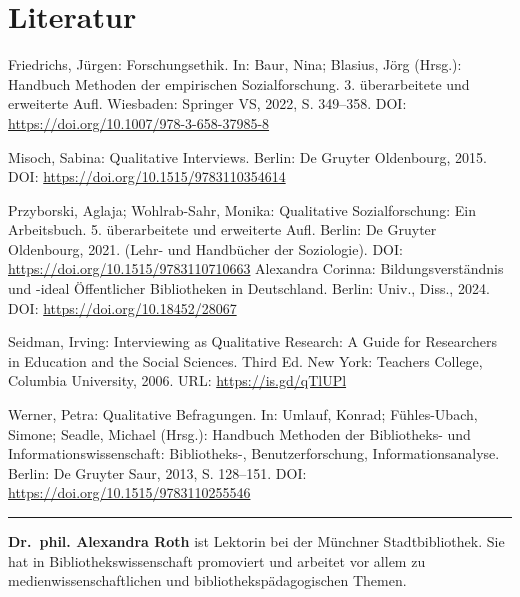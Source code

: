 \documentclass[a4paper,
fontsize=11pt,
oneside,
numbers=noperiodatend,
parskip=half-,
bibliography=totoc,
final
]{scrartcl}
\begin{document}
\section{Literatur}\label{literatur}

Friedrichs, Jürgen: Forschungsethik. In: Baur, Nina; Blasius, Jörg
(Hrsg.): Handbuch Methoden der empirischen Sozialforschung. 3.
überarbeitete und erweiterte Aufl. Wiesbaden: Springer VS, 2022, S.
349--358. DOI: \url{https://doi.org/10.1007/978-3-658-37985-8}

Misoch, Sabina: Qualitative Interviews. Berlin: De Gruyter Oldenbourg,
2015. DOI: \url{https://doi.org/10.1515/9783110354614}

Przyborski, Aglaja; Wohlrab-Sahr, Monika: Qualitative Sozialforschung:
Ein Arbeitsbuch. 5. \linebreak überarbeitete und erweiterte Aufl. Berlin: De
Gruyter Oldenbourg, 2021. (Lehr- und Handbücher der Soziologie). DOI:
\url{https://doi.org/10.1515/9783110710663} Alexandra Corinna:
Bildungsverständnis und -ideal Öffentlicher Bibliotheken in Deutschland.
Berlin: Univ., Diss., 2024. DOI: \url{https://doi.org/10.18452/28067}

Seidman, Irving: Interviewing as Qualitative Research: A Guide for
Researchers in Education and the Social Sciences. Third Ed. New York:
Teachers College, Columbia University, 2006. URL:
\url{https://is.gd/qTlUPl}

Werner, Petra: Qualitative Befragungen. In: Umlauf, Konrad;
Fühles-Ubach, Simone; Seadle, Michael (Hrsg.): Handbuch Methoden der
Bibliotheks- und Informationswissenschaft: Biblio\-theks-,
Benutzerforschung, Informationsanalyse. Berlin: De Gruyter Saur, 2013,
S. 128--151. DOI: \url{https://doi.org/10.1515/9783110255546}

\begin{center}\rule{0.5\linewidth}{0.5pt}\end{center}

\textbf{Dr.~phil. Alexandra Roth} ist Lektorin bei der Münchner
Stadtbibliothek. Sie hat in Bibliothekswissenschaft promoviert und
arbeitet vor allem zu medienwissenschaftlichen und
bibliotheks\-pädagogischen Themen.
\end{document}
